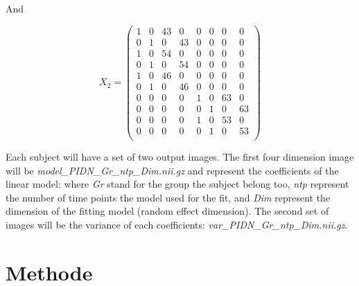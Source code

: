 \documentclass[final, paper=letter,5p,times,twocolumn]{elsarticle}
\theoremstyle{definition}
\begin{document}
And

$$
X_{2} = \left(
\begin{array}{cccccccc}
 1 &   0 &  43 &   0 &   0 &   0 &   0 &   0 \\
 0 &   1 &   0 &  43 &   0 &   0 &   0 &   0 \\
 1 &   0 &  54 &   0 &   0 &   0 &   0 &   0 \\
 0 &   1 &   0 &  54 &   0 &   0 &   0 &   0 \\
 1 &   0 &  46 &   0 &   0 &   0 &   0 &   0 \\
 0 &   1 &   0 &  46 &   0 &   0 &   0 &   0 \\
 0 &   0 &   0 &   0 &   1 &   0 &  63 &   0 \\
 0 &   0 &   0 &   0 &   0 &   1 &   0 &  63 \\
 0 &   0 &   0 &   0 &   1 &   0 &  53 &   0 \\
 0 &   0 &   0 &   0 &   0 &   1 &   0 &  53 \\
\end{array}
\right)
$$


Each subject will have a set of two output images. The first four dimension image will be {\it model\_PIDN\_Gr\_ntp\_Dim.nii.gz} and represent the coefficients of the linear model: where {\it Gr} stand for the group the subject belong too, {\it ntp} represent the number of time points the model used for the fit, and {\it Dim} represent the dimension of the fitting model (random effect dimension). The second set of images will be the variance of each coefficients: {\it var\_PIDN\_Gr\_ntp\_Dim.nii.gz}.
 
\section{Methode}
\end{document}
